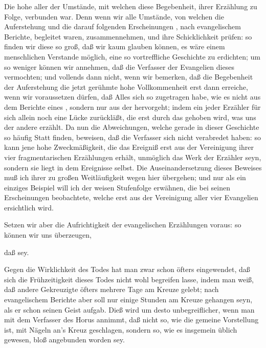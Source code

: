 \begin{aufza}
\begin{aufzb}
\item Die hohe  aller der Umstände, mit welchen diese Begebenheit, ihrer Erzählung zu Folge, verbunden war. Denn wenn wir alle Umstände, von welchen die Auferstehung und die darauf folgenden Erscheinungen , nach evangelischem Berichte, begleitet waren, zusammennehmen, und ihre Schicklichkeit prüfen: so finden wir diese so groß, daß wir kaum glauben können, es wäre einem menschlichen Verstande möglich, eine so vortreffliche Geschichte zu erdichten; um so weniger können wir annehmen, daß die Verfasser der Evangelien dieses vermochten; und vollends dann nicht, wenn wir bemerken, daß die Begebenheit der Auferstehung die jetzt gerühmte hohe Vollkommenheit erst dann erreiche, wenn wir voraussetzen dürfen, daß Alles sich so zugetragen habe, wie es nicht aus dem Berichte eines , sondern nur aus der  hervorgeht; indem ein jeder Erzähler für sich allein noch eine Lücke zurückläßt, die erst durch das gehoben wird, was uns der andere erzählt. Da nun die Abweichungen, welche gerade in dieser Geschichte so häufig Statt finden, beweisen, daß die Verfasser sich nicht verabredet haben: so kann jene hohe Zweckmäßigkeit, die das Ereigniß erst aus der Vereinigung ihrer vier fragmentarischen Erzählungen erhält, unmöglich das Werk der Erzähler seyn, sondern sie liegt in dem Ereignisse selbst. Die Auseinandersetzung dieses Beweises muß ich ihrer zu großen Weitläufigkeit wegen hier übergehen; und nur als ein einziges Beispiel will ich der weisen Stufenfolge erwähnen, die  bei seinen Erscheinungen beobachtete, welche erst aus der Vereinigung aller vier Evangelien ersichtlich wird.
\end{aufzb}
\item Setzen wir aber die Aufrichtigkeit der evangelischen Erzählungen voraus: so können wir uns überzeugen,
\begin{aufzb}
\item daß  sey.~\par
Gegen die Wirklichkeit des Todes  hat man zwar schon öfters eingewendet, daß sich die Frühzeitigkeit dieses Todes nicht wohl begreifen lasse, indem man weiß, daß andere Gekreuzigte öfters mehrere Tage am Kreuze gelebt; nach evangelischem Berichte aber soll  nur einige Stunden am Kreuze gehangen seyn, als er schon seinen Geist aufgab. Dieß wird um desto unbegreiflicher, wenn man mit dem Verfasser des Horus annimmt, daß  nicht so, wie die gemeine Vorstellung ist, mit Nägeln an's Kreuz geschlagen, sondern so, wie es insgemein üblich gewesen, bloß angebunden worden sey.\par

\end{aufzb}
\end{aufza}
